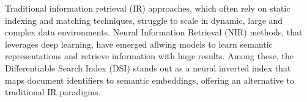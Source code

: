 





Traditional information retrieval (IR) approaches, which often rely on static indexing and matching techniques, struggle to scale in dynamic, large and complex data environments. Neural Information Retrieval (NIR) methods, that leverages deep learning, have emerged allwing models to learn semantic representations and retrieve information with huge results. Among these, the Differentiable Search Index (DSI) stands out as a neural inverted index that maps document identifiers to semantic embeddings, offering an alternative to traditional IR paradigms.


